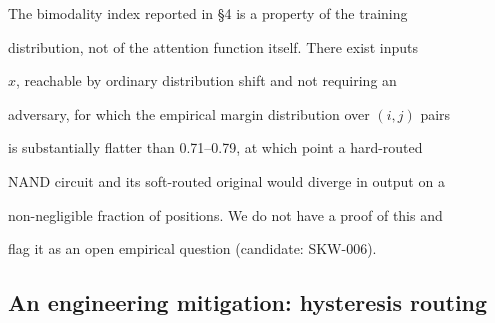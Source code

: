 \begin{conjecture}





\label{conj:shift}





The bimodality index reported in \S4 is a property of the training





distribution, not of the attention function itself. There exist inputs





$x$, reachable by ordinary distribution shift and not requiring an





adversary, for which the empirical margin distribution over $(i,j)$ pairs





is substantially flatter than 0.71--0.79, at which point a hard-routed





NAND circuit and its soft-routed original would diverge in output on a





non-negligible fraction of positions. We do not have a proof of this and





flag it as an open empirical question (candidate: SKW-006).





\end{conjecture}











\subsection{An engineering mitigation: hysteresis routing}











